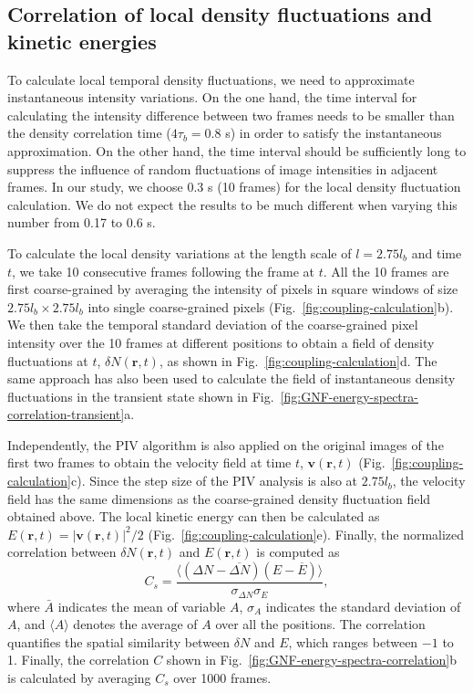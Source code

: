 \documentclass[twocolumn,aps,prx,amsmath,amssymb,longbibliography,superscriptaddress]{revtex4-2}
\begin{document}
\subsection{Correlation of local density fluctuations and kinetic energies} \label{appendix-IA-localcorrelation}

To calculate local temporal density fluctuations, we need to approximate instantaneous intensity variations. On the one hand, the time interval for calculating the intensity difference between two frames needs to be smaller than the density correlation time ($4\tau_b = 0.8$ s) in order to satisfy the instantaneous approximation. On the other hand, the time interval should be sufficiently long to suppress the influence of random fluctuations of image intensities in adjacent frames. In our study, we choose 0.3 s (10 frames) for the local density fluctuation calculation. We do not expect the results to be much different when varying this number from 0.17 to 0.6 s.

To calculate the local density variations at the length scale of $l = 2.75l_b$ and time $t$, we take 10 consecutive frames following the frame at $t$. All the 10 frames are first coarse-grained by averaging the intensity of pixels in square windows of size $2.75l_b \times 2.75l_b$ into single coarse-grained pixels (Fig.~\ref{fig:coupling-calculation}b). We then take the temporal standard deviation of the coarse-grained pixel intensity over the 10 frames at different positions to obtain a field of density fluctuations at $t$, $\delta N(\bm{r},t)$, as shown in Fig.~\ref{fig:coupling-calculation}d. The same approach has also been used to calculate the field of instantaneous density fluctuations in the transient state shown in Fig.~\ref{fig:GNF-energy-spectra-correlation-transient}a.

Independently, the PIV algorithm is also applied on the original images of the first two frames to obtain the velocity field at time $t$, $\bm{v}(\bm{r},t)$ (Fig.~\ref{fig:coupling-calculation}c). Since the step size of the PIV analysis is also at $2.75l_b$, the velocity field has the same dimensions as the coarse-grained density fluctuation field obtained above. The local kinetic energy can then be calculated as $E(\bm{r},t)=|\bm{v}(\bm{r},t)|^2/2$ (Fig.~\ref{fig:coupling-calculation}e). Finally, the normalized correlation between $\delta N(\bm{r},t)$ and $E(\bm{r},t)$ is computed as
\begin{equation}
C_s = \frac{\langle(\Delta N-\overline{\Delta N})(E-\overline{E})\rangle}{\sigma_{\Delta N}\sigma_{E}},
\end{equation}
where $\bar A$ indicates the mean of variable $A$, $\sigma_A$ indicates the standard deviation of $A$, and $\langle A \rangle$ denotes the average of $A$ over all the positions. The correlation quantifies the spatial similarity between $\delta N$ and $E$, which ranges between $-1$ to 1. Finally, the correlation $C$ shown in Fig.~\ref{fig:GNF-energy-spectra-correlation}b is
calculated by averaging $C_s$ over 1000 frames.
\end{document}
